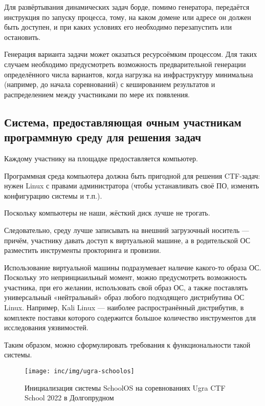 Для развёртывания динамических задач борде, помимо генератора, передаётся инструкция по запуску процесса, тому, на каком домене или адресе он должен быть доступен, и при каких условиях его необходимо перезапустить или остановить.

Генерация варианта задачи может оказаться ресурсоёмким процессом. Для таких случаем необходимо предусмотреть возможность предварительной генерации определённого числа вариантов, когда нагрузка на инфраструктуру минимальна (например, до начала соревнований) с кешированием результатов и распределением между участниками по мере их появления.

\subsection{Система, предоставляющая очным участникам программную среду для решения задач}

Каждому участнику на площадке предоставляется компьютер.

Программная среда компьютера должна быть пригодной для решения CTF-задач: нужен Linux с правами администратора (чтобы устанавливать своё ПО, изменять конфигурацию системы и т.п.).

Поскольку компьютеры не наши, жёсткий диск лучше не трогать.

Следовательно, среду лучше записывать на внешний загрузочный носитель — причём, участнику давать доступ к виртуальной машине, а в родительской ОС разместить инструменты прокторинга и провизии.

Использование виртуальной машины подразумевает наличие какого-то образа ОС. Поскольку это непринциаильный момент, можно предусмотреть возможность участника, при его желании, использовать свой образ ОС, а также поставлять универсальный «нейтральный» образ любого подходящего дистрибутива ОС Linux. Например, Kali Linux — наиболее распространённый дистрибутив, в комплекте поставки которого содержится большое количество инструментов для исследования уязвимостей.

Таким образом, можно сформулировать требования к функциональности такой системы.

\begin{figure}
  \centering
  \texttt{[image: inc/img/ugra-schoolos]}
  \caption{Инициализация системы SchoolOS на соревнованиях Ugra CTF School 2022 в Долгопрудном}
  \label{fig:jeopardy}
\end{figure}

